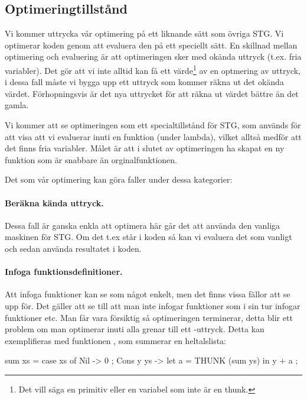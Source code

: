\documentclass[Rapport]{subfiles}
\begin{document}
\subsection{Optimeringtillstånd}


Vi kommer uttrycka vår optimering på ett liknande sätt som övriga STG. Vi optimerar
koden genom att evaluera den på ett speciellt sätt. En skillnad mellan optimering och
evaluering är att optimeringen sker med okända uttryck (t.ex. fria variabler). 
Det gör att vi inte alltid kan få ett värde\footnote{ Det vill säga en primitiv eller en variabel som inte
är en thunk.}  av en optmering av uttryck, i dessa
fall måste vi bygga upp ett uttryck som kommer räkna ut det okända värdet. Förhopningsvis
är det nya uttrycket för att räkna ut värdet bättre än det gamla.

Vi kommer att se optimeringen som ett specialtillstånd för STG, som används
för att visa att vi evaluerar inuti en funktion (under lambda), vilket alltså medför
att det finns fria variabler. Målet  är att i slutet av optimeringen
ha skapat en ny funktion som är snabbare än orginalfunktionen.

Det som vår optimering kan göra faller under dessa kategorier:

\paragraph{ Beräkna kända uttryck. }
Dessa fall är ganska enkla att optimera här går det att använda den vanliga
maskinen för STG. Om det t.ex står  i koden så kan vi evaluera
det som vanligt och sedan använda resultatet  i koden.

\paragraph{ Infoga funktionsdefinitioner. }

Att infoga funktioner kan se som något enkelt, men det finns vissa fällor att se upp
för. Det gäller att se till att man inte infogar funktioner som i sin tur infogar funktioner etc.
Man får vara försiktig så optimeringen terminerar, detta blir ett problem om man
optimerar inuti alla grenar till ett -uttryck. Detta kan exemplifieras
med funktionen , som summerar en heltalslista:

\begin{codeEx}
sum xs = case xs of
    { Nil -> 0
    ; Cons y ys -> let
        { a = THUNK (sum ys)
        } in y + a
    };
\end{codeEx}
\end{document}

